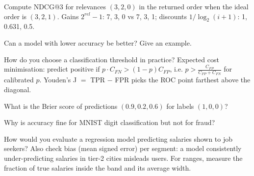 \begin{qa}{Compute NDCG@3 for relevances $(3, 2, 0)$ in the returned order when the ideal order is $(3, 2, 1)$.}
\why Gains $2^{rel} - 1$: 7, 3, 0 vs 7, 3, 1; discounts $1/\log_2(i+1)$: 1, 0.631, 0.5.
\end{qa}

\begin{qa}{\deep Can a model with lower accuracy be better? Give an example.}
\end{qa}

\begin{qa}{How do you choose a classification threshold in practice?}
\why Expected cost minimisation: predict positive if $p\cdot C_{FN} > (1-p)C_{FP}$, i.e. $p > \frac{C_{FP}}{C_{FP} + C_{FN}}$ for calibrated
$p$. Youden's J $=$ TPR $-$ FPR picks the ROC point farthest above the diagonal.
\end{qa}

\begin{qa}{What is the Brier score of predictions $(0.9, 0.2, 0.6)$ for labels $(1, 0, 0)$?}
\end{qa}

\begin{qa}{\deep Why is accuracy fine for MNIST digit classification but not for fraud?}
\end{qa}

\begin{qa}{How would you evaluate a regression model predicting salaries shown to job seekers?}
\why Also check bias (mean signed error) per segment: a model consistently under-predicting salaries in tier-2 cities misleads users. For
ranges, measure the fraction of true salaries inside the band and its average width.
\end{qa}
